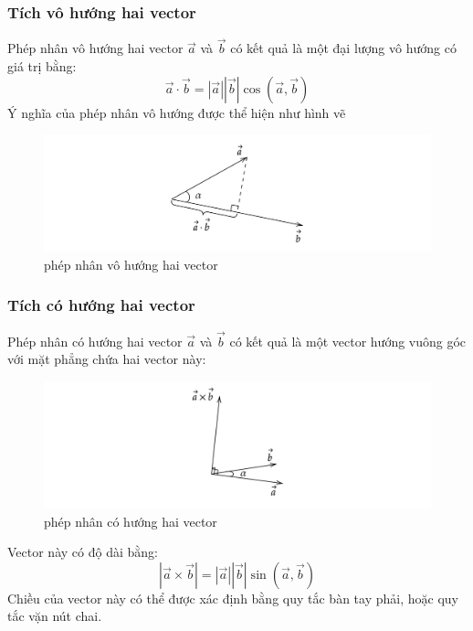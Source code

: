 \subsubsection{Tích vô hướng hai vector}
Phép nhân vô hướng hai vector \(\overrightarrow{a}\) và \(\overrightarrow{b}\) có kết quả là một đại lượng vô hướng có giá trị bằng:
\begin{equation}
    \overrightarrow{a} \cdot \overrightarrow{b} = |\overrightarrow{a}| |\overrightarrow{b}| \cos (\overrightarrow{a}, \overrightarrow{b})
\end{equation}
Ý nghĩa của phép nhân vô hướng được thể hiện như hình vẽ
\begin{figure}[H]
    \centering
    \includegraphics[width=1\textwidth]{Tuan2/Figures/tichcham.png}
    \caption{phép nhân vô hướng hai vector}
\end{figure}
\subsubsection{Tích có hướng hai vector}
Phép nhân có hướng hai vector \(\overrightarrow{a}\) và \(\overrightarrow{b}\) có kết quả là một vector hướng vuông góc với mặt phẳng chứa hai vector này:
\begin{figure}[H]
    \centering
    \includegraphics[width=1\textwidth]{Tuan2/Figures/tichcheo.png}
    \caption{phép nhân có hướng hai vector}
\end{figure}
Vector này có độ dài bằng:
\begin{equation}
    |\overrightarrow{a} \times \overrightarrow{b}| = |\overrightarrow{a}| |\overrightarrow{b}| \sin (\overrightarrow{a}, \overrightarrow{b})
\end{equation}
Chiều của vector này có thể được xác định bằng quy tắc bàn tay phải, hoặc quy tắc vặn nút chai.


